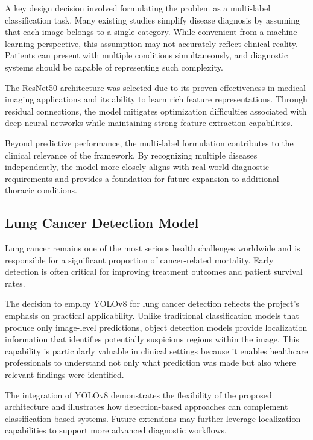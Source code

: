 A key design decision involved formulating the problem as a multi-label classification task. Many existing studies simplify disease diagnosis by assuming that each image belongs to a single category. While convenient from a machine learning perspective, this assumption may not accurately reflect clinical reality. Patients can present with multiple conditions simultaneously, and diagnostic systems should be capable of representing such complexity.

The ResNet50 architecture was selected due to its proven effectiveness in medical imaging applications and its ability to learn rich feature representations. Through residual connections, the model mitigates optimization difficulties associated with deep neural networks while maintaining strong feature extraction capabilities.

Beyond predictive performance, the multi-label formulation contributes to the clinical relevance of the framework. By recognizing multiple diseases independently, the model more closely aligns with real-world diagnostic requirements and provides a foundation for future expansion to additional thoracic conditions.

\subsection{Lung Cancer Detection Model}

Lung cancer remains one of the most serious health challenges worldwide and is responsible for a significant proportion of cancer-related mortality. Early detection is often critical for improving treatment outcomes and patient survival rates.

The decision to employ YOLOv8 for lung cancer detection reflects the project's emphasis on practical applicability. Unlike traditional classification models that produce only image-level predictions, object detection models provide localization information that identifies potentially suspicious regions within the image. This capability is particularly valuable in clinical settings because it enables healthcare professionals to understand not only what prediction was made but also where relevant findings were identified.

The integration of YOLOv8 demonstrates the flexibility of the proposed architecture and illustrates how detection-based approaches can complement classification-based systems. Future extensions may further leverage localization capabilities to support more advanced diagnostic workflows.

